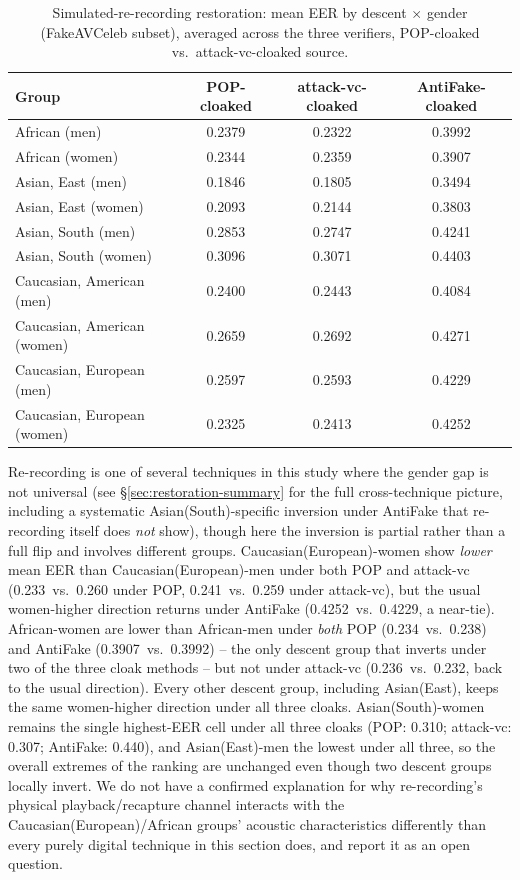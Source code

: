 \documentclass[11pt]{article}
\begin{document}
\begin{table}[H]
\centering
\caption{Simulated-re-recording restoration: mean EER by descent
$\times$ gender (FakeAVCeleb subset), averaged across the three
verifiers, POP-cloaked vs.\ attack-vc-cloaked source.}
\label{tab:restoration-rerecording-demographics}
\begin{tabular}{lccc}
\toprule
Group & POP-cloaked & attack-vc-cloaked & AntiFake-cloaked \\
\midrule
African (men)               & 0.2379 & 0.2322 & 0.3992 \\
African (women)              & 0.2344 & 0.2359 & 0.3907 \\
Asian, East (men)            & 0.1846 & 0.1805 & 0.3494 \\
Asian, East (women)          & 0.2093 & 0.2144 & 0.3803 \\
Asian, South (men)           & 0.2853 & 0.2747 & 0.4241 \\
Asian, South (women)         & 0.3096 & 0.3071 & 0.4403 \\
Caucasian, American (men)    & 0.2400 & 0.2443 & 0.4084 \\
Caucasian, American (women)  & 0.2659 & 0.2692 & 0.4271 \\
Caucasian, European (men)    & 0.2597 & 0.2593 & 0.4229 \\
Caucasian, European (women)  & 0.2325 & 0.2413 & 0.4252 \\
\bottomrule
\end{tabular}
\end{table}

Re-recording is one of several techniques in this study where the
gender gap is not universal (see \S\ref{sec:restoration-summary} for
the full cross-technique picture, including a systematic
Asian(South)-specific inversion under AntiFake that re-recording itself
does \emph{not} show), though here the inversion is
partial rather than a full flip and involves different groups.
Caucasian(European)-women show
\emph{lower} mean EER than Caucasian(European)-men under both POP and
attack-vc (0.233~vs.\ 0.260 under POP, 0.241~vs.\ 0.259 under
attack-vc), but the usual women-higher direction returns under
AntiFake (0.4252~vs.\ 0.4229, a near-tie). African-women are lower than
African-men under \emph{both} POP (0.234~vs.\ 0.238) and AntiFake
(0.3907~vs.\ 0.3992) -- the only descent group that inverts under two
of the three cloak methods -- but not under attack-vc (0.236~vs.\ 0.232,
back to the usual direction). Every other descent group, including
Asian(East), keeps the same women-higher direction under all three
cloaks. Asian(South)-women remains the single highest-EER cell under
all three cloaks (POP: 0.310; attack-vc: 0.307; AntiFake: 0.440), and
Asian(East)-men the lowest under all three, so the overall extremes of
the ranking are unchanged even though two descent groups locally
invert. We do not have a confirmed explanation for why re-recording's
physical playback/recapture channel interacts with the
Caucasian(European)/African groups' acoustic characteristics
differently than every purely digital technique in this section does,
and report it as an open question.
\end{document}
